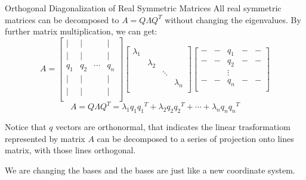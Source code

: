 \documentclass{beamer}
\begin{document}
\begin{frame}{Orthogonal Diagonalization of Real Symmetric Matrices}
All real symmetric matrices can be decomposed to $A=Q\varLambda Q^T$ without changing the eigenvalues. By further matrix multiplication, we can get:
\begin{equation*}
    A=\left[ \begin{matrix}
        |&		|&		&		|\\
        |&		|&		&		|\\
        q_1&		q_2&		\cdots&		q_n\\
        |&		|&		&		|\\
        |&		|&		&		|\\
    \end{matrix} \right] \left[ \begin{matrix}
        \lambda _1&		&		&		\\
        &		\lambda _2&		&		\\
        &		&		\ddots&		\\
        &		&		&		\lambda _n\\
    \end{matrix} \right] \left[ \begin{matrix}
        -&		-&		q_1&		-&		-\\
        -&		-&		q_2&		-&		-\\
        &		&		\vdots&		&		\\
        -&		-&		q_n&		-&		-\\
    \end{matrix} \right]
\end{equation*}
\begin{equation*}
    A=Q\varLambda Q^T=\lambda _1q_1{q_1}^T+\lambda _2q_2{q_2}^T+\cdots +\lambda _nq_n{q_n}^T
\end{equation*}

Notice that $q$ vectors are orthonormal, that indicates the linear trasformatiom represented by matrix $A$ can be decomposed to a series of projection onto lines matrix, with those lines orthogonal.

\vspace{3pt}
We are changing the bases and the bases are just like a new coordinate system.
\end{frame}
\end{document}
